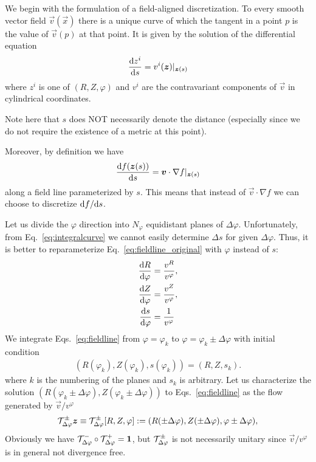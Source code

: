 We begin with the formulation of a field-aligned discretization.
To every smooth vector field $\vec v(\vec x)$ there is a unique curve of which the
tangent in a point $p$ is the value of $\vec v(p)$ at that point. It is given by
the solution of the differential equation
\begin{align}
  \frac{\mathrm{d} z^i}{\mathrm{d} s} = v^i({\boldsymbol{z}})|_{{\boldsymbol{z}}(s)}
    \label{eq:integralcurve}
\end{align}
where $z^i$ is one of $(R, Z, \varphi)$ and $v^i$ are the contravariant components
of $\vec v$ in cylindrical coordinates.
\begin{tcolorbox}[title=Note]
Note here that $s$ does NOT necessarily denote the distance
(especially since we do not require the existence of a metric at this point).
\end{tcolorbox}
Moreover, by definition we have
\begin{align}
    \frac{\mathrm{d} f({\boldsymbol{z}}(s))}{\mathrm{d} s} = {\boldsymbol{v}}\cdot \nabla f|_{{\boldsymbol{z}}(s)}
    \label{eq:fieldline_original}
\end{align}
along a field line parameterized by $s$.
This means that instead of $\vec v \cdot \nabla f$ we can choose to discretize ${\mathrm{d} f}/{\mathrm{d} s}$.

Let us divide the $\varphi$ direction into $N_\varphi$ equidistant planes of
$\Delta \varphi$. Unfortunately, from Eq.~\eqref{eq:integralcurve} we cannot easily determine
$\Delta s$ for given $\Delta \varphi$.
Thus, it is better to reparameterize Eq.~\eqref{eq:fieldline_original} with $\varphi$ instead of $s$:
\begin{subequations}
\begin{align}
    \frac{\d R}{\d\varphi}&= \frac{v^R}{v^\varphi},\\ %
    \frac{\d Z}{\d\varphi}&=\frac{v^Z}{v^\varphi},\\%
    \frac{\d s}{\d\varphi}&=\frac{1}{v^\varphi}
\end{align}
\label{eq:fieldline}
\end{subequations}
We integrate Eqs.~\eqref{eq:fieldline} from $\varphi=\varphi_k$ to $\varphi=\varphi_k\pm \Delta \varphi$
with initial condition
\begin{align}
    (R(\varphi_k), Z(\varphi_k), s(\varphi_k) ) = (R, Z, s_k).
    \label{}
\end{align}
where $k$ is the numbering of the planes and $s_k$ is arbitrary.
Let us characterize the solution $(R(\varphi_k\pm \Delta \varphi), Z(\varphi_k\pm \Delta \varphi))$ to Eqs.~\eqref{eq:fieldline} as the flow generated by $\vec v/v^\varphi$
\begin{align}
    \mathcal T^\pm_{\Delta\varphi}{\boldsymbol{z}} \equiv \mathcal T^\pm_{\Delta\varphi}[R, Z, \varphi]:= ( R(\pm \Delta\varphi), Z( \pm \Delta\varphi), \varphi\pm\Delta \varphi),
    \label{}
\end{align}
Obviously we have $\mathcal T^-_{\Delta\varphi}\circ\mathcal T^+_{\Delta\varphi} = \mathbf{1}$, but $\mathcal T^\pm_{\Delta\varphi}$ is not necessarily unitary since $\vec v/v^\varphi$ is in general
not divergence free.

